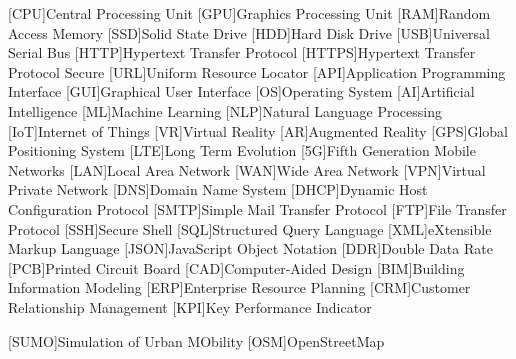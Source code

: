 \begin{acronym}[XXXXXXX]  %
    [CPU]{Central Processing Unit}
    [GPU]{Graphics Processing Unit}
    [RAM]{Random Access Memory}
    [SSD]{Solid State Drive}
    [HDD]{Hard Disk Drive}
    [USB]{Universal Serial Bus}
    [HTTP]{Hypertext Transfer Protocol}
    [HTTPS]{Hypertext Transfer Protocol Secure}
    [URL]{Uniform Resource Locator}
    [API]{Application Programming Interface}
    [GUI]{Graphical User Interface}
    [OS]{Operating System}
    [AI]{Artificial Intelligence}
    [ML]{Machine Learning}
    [NLP]{Natural Language Processing}
    [IoT]{Internet of Things}
    [VR]{Virtual Reality}
    [AR]{Augmented Reality}
    [GPS]{Global Positioning System}
    [LTE]{Long Term Evolution}
    [5G]{Fifth Generation Mobile Networks}
    [LAN]{Local Area Network}
    [WAN]{Wide Area Network}
    [VPN]{Virtual Private Network}
    [DNS]{Domain Name System}
    [DHCP]{Dynamic Host Configuration Protocol}
    [SMTP]{Simple Mail Transfer Protocol}
    [FTP]{File Transfer Protocol}
    [SSH]{Secure Shell}
    [SQL]{Structured Query Language}
    [XML]{eXtensible Markup Language}
    [JSON]{JavaScript Object Notation}
    [DDR]{Double Data Rate}
    [PCB]{Printed Circuit Board}
    [CAD]{Computer-Aided Design}
    [BIM]{Building Information Modeling}
    [ERP]{Enterprise Resource Planning}
    [CRM]{Customer Relationship Management}
    [KPI]{Key Performance Indicator}
  
    [SUMO]{Simulation of Urban MObility}
    [OSM]{OpenStreetMap}
    \ifdefined\EnableVerzeichnisStresstest
      
    \fi
  \end{acronym}
